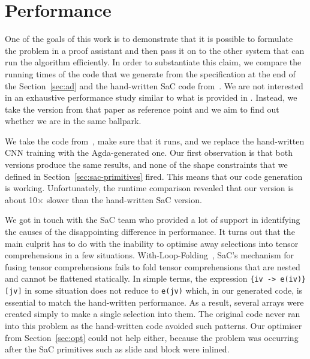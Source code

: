 \section{Performance\label{sec:performance}}

%


One of the goals of this work is to demonstrate that it is possible to formulate
the problem in a proof assistant and then pass it on to the other system that can
run the algorithm efficiently.  In order to substantiate this claim, we compare
the running times of the code that we generate from the specification at the end of the
Section~\ref{sec:ad} and the hand-written SaC code from~\cite{cnn-array}.
We are not interested in an exhaustive performance study similar to what is provided
in \cite{cnn-array}. Instead, we take the version from that paper as reference point 
and we aim to find out whether we are in the same ballpark.

We take the code from~\cite{cnn-array}, make sure that it runs, and we replace
the hand-written CNN training with the Agda-generated one. 
Our first observation is that both versions 
produce the same results, and none of the shape constraints
that we defined in Section~\ref{sec:sac-primitives} fired.  This means that our
code generation is working.  Unfortunately, the runtime comparison revealed that
our version is about 10$\times$ slower than the hand-written SaC version.

We got in touch with the SaC team who provided a lot of support in identifying
the causes of the disappointing difference in performance.  It turns out that the main culprit has
to do with the inability to optimise away selections into tensor comprehensions in a few situations.
With-Loop-Folding~\cite{wlf}, SaC's mechanism for fusing tensor comprehensions fails to fold
tensor comprehensions that are nested and cannot be flattened statically.
In simple terms, the expression \texttt{\{iv -> e(iv)\}[jv]} in some situation does not reduce to
\texttt{e(jv)} which, in our generated code, is essential to match the hand-written performance.
As a result, several arrays were created
simply to make a single selection into them.  The original code never ran into this
problem as the hand-written code avoided such patterns.  Our  optimiser
from Section~\ref{sec:opt} could not help either, because the problem was occurring after
the SaC primitives such as slide and block were inlined.

